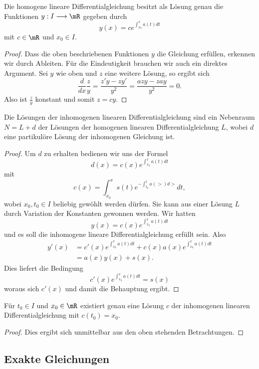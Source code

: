 \documentclass[%
draft,
11pt,%
twoside,%
titlepage,%
german,%
headsepline%
]{scrartcl}
\begin{document}
\begin{satz}
Die homogene lineare Differentialgleichung besitzt als L\"osung genau die Funktionen $y:I\longrightarrow\mR$ gegeben durch
$$y(x)=ce^{\int_{x_0}^xa(t)dt}$$
mit $c\in\mR$ und $x_0\in I$.
\end{satz}

\begin{proof}
Dass die oben beschriebenen Funktionen $y$ die Gleichung erf\"ullen, erkennen wir durch Ableiten. F\"ur die Eindeutigkeit brauchen wir auch ein direktes Argument. Sei $y$ wie oben und $z$ eine weitere L\"osung, so ergibt sich
$$\frac{d}{dx}\frac{z}{y}=\frac{z'y-zy'}{y^2}=\frac{azy-zay}{y^2}=0.$$
Also ist $\frac{z}{y}$ konstant und somit $z=cy$.
\end{proof}

\begin{satz}
Die L\"osungen der inhomogenen linearen Differentialgleichung sind ein Nebenraum $N=L+d$ der L\"osungen der homogenen linearen Differentialgleichung $L$, wobei $d$ eine partikul\"ore L\"osung der inhomogenen Gleichung ist.
\end{satz}

\begin{proof}
Um $d$ zu erhalten bedienen wir uns der Formel
$$d(x)=c(x)e^{\int_{x_0}^xa(t)dt}$$
mit
$$c(x)=\int_{x_0}^xs(t)e^{-\int_{t_0}^ta(\gt)d\gt}dt,$$
wobei $x_0,t_0\in I$ beliebig gew\"ohlt werden d\"urfen.
Sie kann aus einer L\"osung $L$ durch Variation der Konstanten gewonnen werden. Wir hatten
$$y(x)=c(x)e^{\int_{x_0}^xa(t)dt}$$
und es soll die inhomogene lineare Differentialgleichung erf\"ullt sein. Also
\begin{align*}
y'(x) &=c'(x)e^{\int_{x_0}^xa(t)dt}+c(x)a(x)e^{\int_{x_0}^xa(t)dt}\\
&=a(x)y(x)+s(x).
\end{align*}
Dies liefert die Bedingung
$$c'(x)e^{\int_{x_0}^xa(t)dt}=s(x)$$
woraus sich $c'(x)$ und damit die Behauptung ergibt.
\end{proof}

\begin{kor}
F\"ur $t_0\in I$ und $x_0\in\mR$ existiert genau eine L\"osung $c$ der inhomogenen linearen Differentialgleichung mit $c(t_0)=x_0$.
\end{kor}

\begin{proof}
Dies ergibt sich unmittelbar aus den oben stehenden Betrachtungen.
\end{proof}

\subsection{Exakte Gleichungen}
\end{document}

